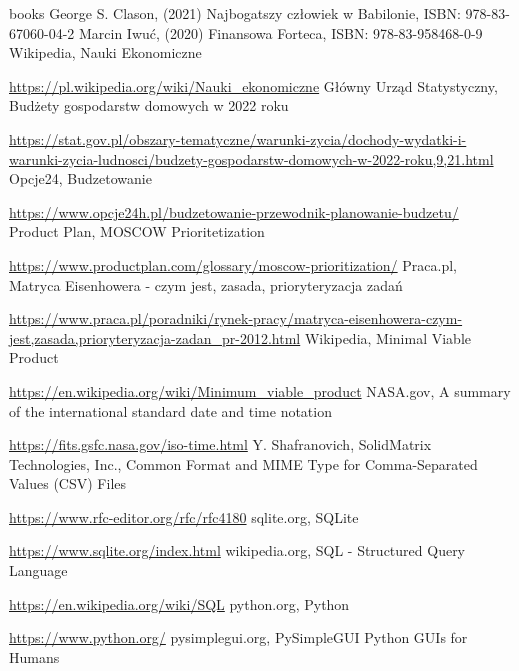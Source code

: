 \documentclass[a4paper,10pt, twoside]{report}
\begin{document}




\begin{thebibliography} {books}
     George S. Clason, (2021) Najbogatszy człowiek w Babilonie, ISBN: 978-83-67060-04-2
     Marcin Iwuć, (2020) Finansowa Forteca, ISBN: 978-83-958468-0-9
     Wikipedia, Nauki Ekonomiczne \raggedright\url{
        https://pl.wikipedia.org/wiki/Nauki_ekonomiczne}
     Główny Urząd Statystyczny, Budżety gospodarstw domowych w 2022 roku \raggedright\url{
        https://stat.gov.pl/obszary-tematyczne/warunki-zycia/dochody-wydatki-i-warunki-zycia-ludnosci/budzety-gospodarstw-domowych-w-2022-roku,9,21.html}
     Opcje24, Budzetowanie \raggedright\url{
        https://www.opcje24h.pl/budzetowanie-przewodnik-planowanie-budzetu/}
     Product Plan, MOSCOW Prioritetization \raggedright\url{
        https://www.productplan.com/glossary/moscow-prioritization/}
    Praca.pl, Matryca Eisenhowera - czym jest, zasada, prioryteryzacja zadań \raggedright\url{
        https://www.praca.pl/poradniki/rynek-pracy/matryca-eisenhowera-czym-jest,zasada,prioryteryzacja-zadan_pr-2012.html}
     Wikipedia, Minimal Viable Product \raggedright\url{
        https://en.wikipedia.org/wiki/Minimum_viable_product}
     NASA.gov, A summary of the international standard date and time notation \raggedright\url{
        https://fits.gsfc.nasa.gov/iso-time.html}
     Y. Shafranovich, SolidMatrix Technologies, Inc., Common Format and MIME Type for Comma-Separated Values (CSV) Files \raggedright\url{
        https://www.rfc-editor.org/rfc/rfc4180}
     sqlite.org, SQLite \raggedright\url{
        https://www.sqlite.org/index.html}
     wikipedia.org, SQL - Structured Query Language \raggedright\url{
        https://en.wikipedia.org/wiki/SQL}
     python.org, Python \raggedright\url{
        https://www.python.org/}
     pysimplegui.org, PySimpleGUI Python GUIs for Humans \raggedright\url{
}
\end{thebibliography}
\end{document}
